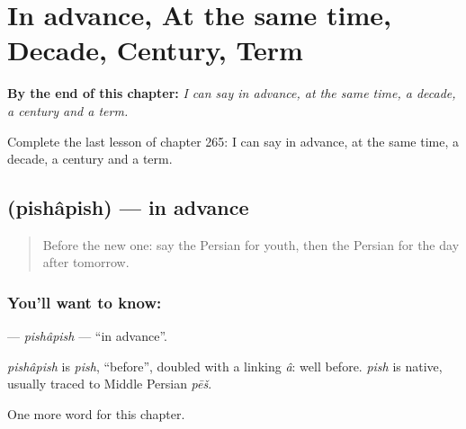 
\chapter{In advance, At the same time, Decade, Century, Term}
\label{ch:fa-in-advance-at-the-same-time-decade-century-term}

\begin{chapteropening}
\textbf{By the end of this chapter:} \emph{I can say in advance, at the same time, a decade, a century and a term.}

Complete the last lesson of chapter 265: I can say in advance, at the same time, a decade, a century and a term.
\end{chapteropening}

\section[\texorpdfstring{\fa{پیشاپیش} (pishâpish)}{پیشاپیش (pishâpish)}]{ (pishâpish) — in advance}

\label{lesson:FA-C265-pishapish}



\begin{quote}
Before the new one: say the Persian for youth, then the Persian for the day after tomorrow.
\end{quote}

\subsection*{You'll want to know: }
\textbf{} — \emph{pishâpish} — \textquotedblleft{}in advance\textquotedblright{}.

\begin{cousinweb}
\emph{pishâpish} is \emph{pish}, \textquotedblleft{}before\textquotedblright{}, doubled with a linking \emph{â}: well before. \emph{pish} is native, usually traced to Middle Persian \emph{pēš}.
\end{cousinweb}

\begin{grammarlens}[title={What you've built}]
One more word for this chapter.
\end{grammarlens}

